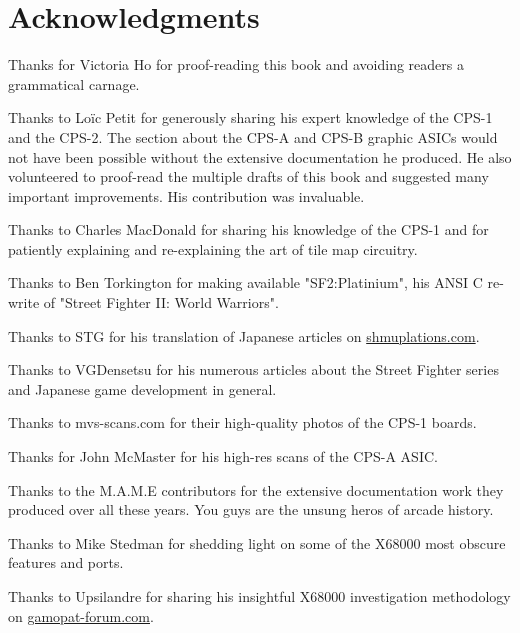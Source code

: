 \chapter*{Acknowledgments} 

Thanks for Victoria Ho for proof-reading this book and avoiding readers a grammatical carnage.

Thanks to Lo\"{i}c Petit for generously sharing his expert knowledge of the CPS-1 and the CPS-2. The section about the CPS-A and CPS-B graphic ASICs would not have been possible without the extensive documentation he produced. He also volunteered to proof-read the multiple drafts of this book and suggested many important improvements. His contribution was invaluable.

Thanks to Charles MacDonald for sharing his knowledge of the CPS-1 and for patiently explaining and re-explaining the art of tile map circuitry.

Thanks to Ben Torkington for making available "SF2:Platinium", his ANSI C re-write of "Street Fighter II: World Warriors".

Thanks to STG for his translation of Japanese articles on \href{https://shmuplations.com}{shmuplations.com}.

Thanks to VGDensetsu for his numerous articles about the Street Fighter series and Japanese game development in general.

Thanks to mvs-scans.com for their high-quality photos of the CPS-1 boards.

Thanks for John McMaster for his high-res scans of the CPS-A ASIC.

Thanks to the M.A.M.E contributors for the extensive documentation work they produced over all these years. You guys are the unsung heros of arcade history.

Thanks to Mike Stedman for shedding light on some of the X68000 most obscure features and ports.

Thanks to Upsilandre for sharing his insightful X68000 investigation methodology on \href{https://www.gamopat-forum.com}{gamopat-forum.com}.